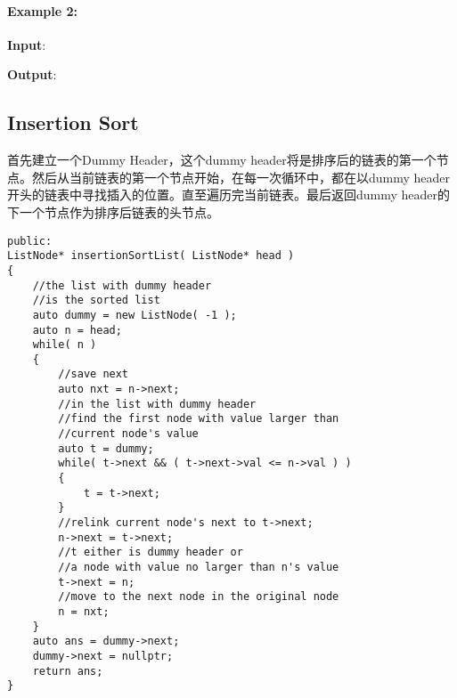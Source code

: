 \paragraph{Example 2:}
\begin{flushleft}
\textbf{Input}:
\begin{figure}[H]
\end{figure}
\textbf{Output}: 
\begin{figure}[H]
\end{figure}
\end{flushleft}
\subsection{Insertion Sort}
首先建立一个Dummy Header，这个dummy header将是排序后的链表的第一个节点。然后从当前链表的第一个节点开始，在每一次循环中，都在以dummy header开头的链表中寻找插入的位置。直至遍历完当前链表。最后返回dummy header的下一个节点作为排序后链表的头节点。

\setcounter{lstlisting}{0}
\begin{lstlisting}[style=customc, caption={Insertion Sort}]
public:
ListNode* insertionSortList( ListNode* head )
{
    //the list with dummy header
    //is the sorted list
    auto dummy = new ListNode( -1 );
    auto n = head;
    while( n )
    {
        //save next
        auto nxt = n->next;
        //in the list with dummy header
        //find the first node with value larger than
        //current node's value
        auto t = dummy;
        while( t->next && ( t->next->val <= n->val ) )
        {
            t = t->next;
        }
        //relink current node's next to t->next;
        n->next = t->next;
        //t either is dummy header or
        //a node with value no larger than n's value
        t->next = n;
        //move to the next node in the original node
        n = nxt;
    }
    auto ans = dummy->next;
    dummy->next = nullptr;
    return ans;
}
\end{lstlisting}